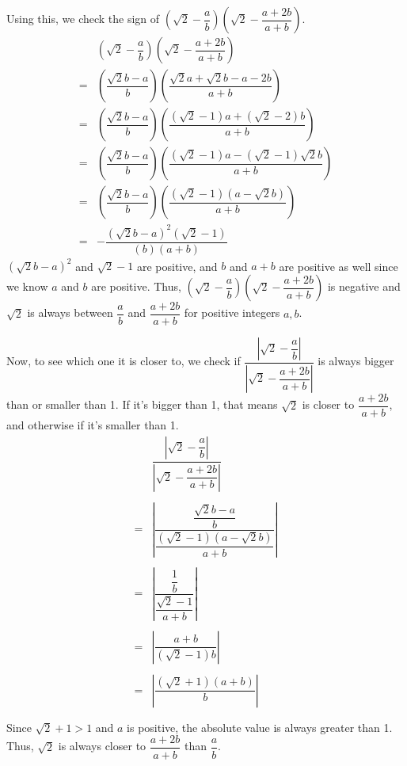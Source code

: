 \documentclass[12pt, oneside]{article}
\begin{document}
Using this, we check the sign of $(\sqrt{2}-\dfrac{a}{b})(\sqrt{2}-\dfrac{a+2b}{a+b})$.
\begin{eqnarray*}
&(\sqrt{2}-\dfrac{a}{b})(\sqrt{2}-\dfrac{a+2b}{a+b})\\
=&(\dfrac{\sqrt{2}b-a}{b})(\dfrac{\sqrt{2}a+\sqrt{2}b-a-2b}{a+b})\\
=&(\dfrac{\sqrt{2}b-a}{b})(\dfrac{(\sqrt{2}-1)a+(\sqrt{2}-2)b}{a+b})\\
=&(\dfrac{\sqrt{2}b-a}{b})(\dfrac{(\sqrt{2}-1)a-(\sqrt{2}-1)\sqrt{2}b}{a+b})\\
=&(\dfrac{\sqrt{2}b-a}{b})(\dfrac{(\sqrt{2}-1)(a-\sqrt{2}b)}{a+b})\\
=&-\dfrac{(\sqrt{2}b-a)^2(\sqrt{2}-1)}{(b)(a+b)}
\end{eqnarray*}
$(\sqrt{2}b-a)^2$ and $\sqrt{2}-1$ are positive, and $b$ and $a+b$ are positive as well since we know $a$ and $b$ are positive. Thus, $(\sqrt{2}-\dfrac{a}{b})(\sqrt{2}-\dfrac{a+2b}{a+b})$ is negative and $\sqrt{2}$ is always between $\dfrac{a}{b}$ and $\dfrac{a+2b}{a+b}$ for positive integers $a, b$.

 Now, to see which one it is closer to, we check if $\dfrac{|\sqrt{2}-\dfrac{a}{b}|}{|\sqrt{2}-\dfrac{a+2b}{a+b}|}$ is always bigger than or smaller than 1. If it's bigger than 1, that means $\sqrt{2}$ is closer to $\dfrac{a+2b}{a+b}$, and otherwise if it's smaller than 1.
\begin{eqnarray*}
&\dfrac{|\sqrt{2}-\dfrac{a}{b}|}{|\sqrt{2}-\dfrac{a+2b}{a+b}|}\\\\
=&\left|\dfrac{\dfrac{\sqrt{2}b-a}{b}}{\dfrac{(\sqrt{2}-1)(a-\sqrt{2}b)}{a+b}}\right|\\\\
=&\left|\dfrac{\dfrac{1}{b}}{\dfrac{\sqrt{2}-1}{a+b}}\right|\\\\
=&\left|\dfrac{a+b}{(\sqrt{2}-1)b}\right|\\\\
=&\left|\dfrac{(\sqrt{2}+1)(a+b)}{b}\right|\\\\
\end{eqnarray*}
Since $\sqrt{2}+1>1$ and $a$ is positive, the absolute value is always greater than 1. Thus, $\sqrt{2}$ is always closer to $\dfrac{a+2b}{a+b}$ than $\dfrac{a}{b}$. 
\end{document}
